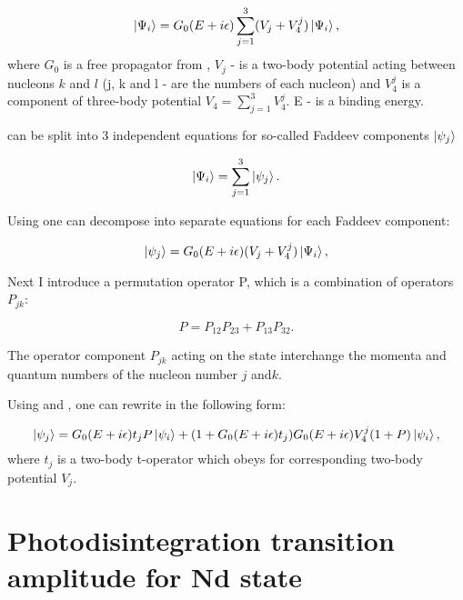     \begin{equation}
        \ket{\Psi_i} = G_0(E+i\epsilon)\sum_{j=1}^3 (V_j + V_4^j) \ket{\Psi_i},
        \label{psi3_total}
    \end{equation}
    where $G_0$ is a free propagator from , $V_j$ - is a two-body potential
    acting between nucleons $k$ and $l$ (j, k and l - are the numbers of each nucleon)
    and $V_4^j$ is a component of three-body potential $V_4 = \sum_{j=1}^3 V_4^j$.
    E - is a binding energy.

     can be split into 3 independent equations for
    so-called Faddeev components $\ket{\psi_j}$

    \begin{equation}
        \ket{\Psi_i} = \sum_{j=1}^3 \ket{\psi_j}.
        \label{faddeev_comps}
    \end{equation}

    Using  one can decompose  into 
    separate equations for each Faddeev component:

    \begin{equation}
        \ket{\psi_j} = G_0(E+i\epsilon)(V_j + V_4^j) \ket{\Psi_i},
        \label{psi3_component}
    \end{equation}

    Next I introduce a permutation operator P, which is a combination
    of operators $P_{jk}$:
    
    \begin{equation}
        P = P_{12}P_{23} + P_{13}P_{32}.
        \label{permutation}
    \end{equation}

    The operator component $P_{jk}$ acting on the state interchange the momenta and  
    quantum numbers of the nucleon number $j$ and$k$.

    Using  and ,
    one can rewrite  in the following form:

    \begin{equation}
        \ket{\psi_j} = G_0(E+i\epsilon)t_j P \ket{\psi_i} + 
        (1 + G_0(E+i\epsilon)t_j)G_0(E+i\epsilon)V_4^j(1+P)\ket{\psi_i},        
    \end{equation}
    where $t_j$ is a two-body t-operator which obeys  for corresponding 
    two-body potential $V_j$.





\section{Photodisintegration transition amplitude for Nd state}
\label{nd_state}

